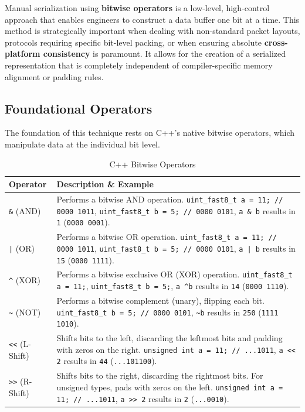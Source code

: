 \documentclass{article}
\begin{document}
Manual serialization using \textbf{bitwise operators} is a low-level, high-control approach that enables engineers to construct a data buffer one bit at a time. This method is strategically important when dealing with non-standard packet layouts, protocols requiring specific bit-level packing, or when ensuring absolute \textbf{cross-platform consistency} is paramount. It allows for the creation of a serialized representation that is completely independent of compiler-specific memory alignment or padding rules.

\subsection{Foundational Operators}

The foundation of this technique rests on C++'s native bitwise operators, which manipulate data at the individual bit level.

\begin{table}[h]
\centering
\caption{C++ Bitwise Operators}
\label{tab:bitwise_operators}
\begin{tabularx}{\linewidth}{l X}
\toprule
\textbf{Operator} & \textbf{Description \& Example} \\
\midrule
\texttt{\&} (AND) & Performs a bitwise AND operation. \texttt{uint\_fast8\_t a = 11; // 0000 1011}, \texttt{uint\_fast8\_t b = 5; // 0000 0101}, \texttt{a \& b} results in \texttt{1} (\texttt{0000 0001}). \\
\texttt{|} (OR) & Performs a bitwise OR operation. \texttt{uint\_fast8\_t a = 11; // 0000 1011}, \texttt{uint\_fast8\_t b = 5; // 0000 0101}, \texttt{a | b} results in \texttt{15} (\texttt{0000 1111}). \\
\texttt{\textasciicircum} (XOR) & Performs a bitwise exclusive OR (XOR) operation. \texttt{uint\_fast8\_t a = 11;}, \texttt{uint\_fast8\_t b = 5;}, \texttt{a \textasciicircum b} results in \texttt{14} (\texttt{0000 1110}). \\
\texttt{\textasciitilde} (NOT) & Performs a bitwise complement (unary), flipping each bit. \texttt{uint\_fast8\_t b = 5; // 0000 0101}, \texttt{\textasciitilde b} results in \texttt{250} (\texttt{1111 1010}). \\
\texttt{<<} (L-Shift) & Shifts bits to the left, discarding the leftmost bits and padding with zeros on the right. \texttt{unsigned int a = 11; // ...1011}, \texttt{a << 2} results in \texttt{44} (\texttt{...101100}). \\
\texttt{>>} (R-Shift) & Shifts bits to the right, discarding the rightmost bits. For unsigned types, pads with zeros on the left. \texttt{unsigned int a = 11; // ...1011}, \texttt{a >> 2} results in \texttt{2} (\texttt{...0010}). \\
\bottomrule
\end{tabularx}
\end{table}
\end{document}
